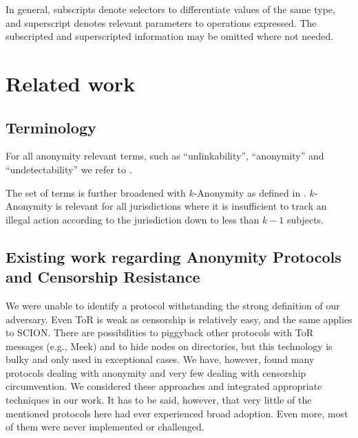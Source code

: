 \documentclass[acmsmall, screen]{acmart}
\begin{document}
In general, subscripts denote selectors to differentiate values of the same type, and superscript denotes relevant parameters to operations expressed. The subscripted and superscripted information may be omitted where not needed.

\section{Related work}
\subsection{Terminology}

For all anonymity relevant terms, such as ``unlinkability'', ``anonymity'' and ``undetectability'' we refer to \cite{anon_terminology}.

The set of terms is further broadened with $k$-Anonymity as defined in \cite{k-anonymous:ccs2003}. $k$-Anonymity is relevant for all jurisdictions where it is insufficient to track an illegal action according to the jurisdiction down to less than $k-1$ subjects.

\subsection{Existing work regarding Anonymity Protocols and Censorship Resistance}
We were unable to identify a protocol withstanding the strong definition of our adversary. Even ToR is weak as censorship is relatively easy, and the same applies to SCION. There are possibilities to piggyback other protocols with ToR messages (e.g., Meek) and to hide nodes on directories, but this technology is bulky and only used in exceptional cases. We have, however, found many protocols dealing with anonymity and very few dealing with censorship circumvention. We considered these approaches and integrated appropriate techniques in our work. It has to be said, however, that very little of the mentioned protocols here had ever experienced broad adoption. Even more, most of them were never implemented or challenged. 
\end{document}
